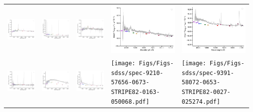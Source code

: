 \begin{center}
\begin{longtable}{l l l l l }
    \includegraphics[width=0.19\linewidth, clip]{Figs/Figs-sdss/spec-3842-55565-0582-SPLUS-n02n20-021184.pdf} & \includegraphics[width=0.19\linewidth, clip]{Figs/Figs-sdss/spec-4205-55454-0490-STRIPE82-0143-027848.pdf} & \includegraphics[width=0.19\linewidth, clip]{Figs/Figs-sdss/spec-4220-55447-0004-STRIPE82-0013-055791.pdf} & \includegraphics[width=0.19\linewidth, clip]{Figs/Figs-sdss/spec-4344-55557-0830-STRIPE82-0055-005329.pdf} & \includegraphics[width=0.19\linewidth, clip]{Figs/Figs-sdss/spec-6781-56274-0507-STRIPE82-0056-011736.pdf} \\
    \includegraphics[width=0.19\linewidth, clip]{Figs/Figs-sdss/spec-7870-57016-0292-STRIPE82-0017-021131.pdf} & \includegraphics[width=0.19\linewidth, clip]{Figs/Figs-sdss/spec-9144-57666-0046-SPLUS-s02s04-008782.pdf} & \includegraphics[width=0.19\linewidth, clip]{Figs/Figs-sdss/spec-9163-58043-0152-STRIPE82-0122-053411.pdf} & \texttt{[image: Figs/Figs-sdss/spec-9210-57656-0673-STRIPE82-0163-050068.pdf]} & \texttt{[image: Figs/Figs-sdss/spec-9391-58072-0653-STRIPE82-0027-025274.pdf]} \\

\end{longtable}
\end{center}

